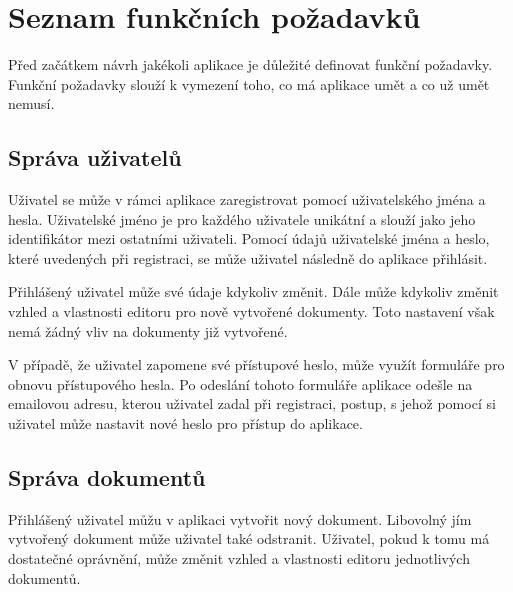 
\section{Seznam funkčních požadavků}\label{sec:funcniPozadavky}
Před začátkem návrh jakékoli aplikace je důležité definovat funkční požadavky.
Funkční požadavky slouží k vymezení toho, co má aplikace umět a co už umět nemusí.

\subsection{Správa uživatelů}\label{subsec:správaUživatelů}

Uživatel se může v rámci aplikace zaregistrovat pomocí uživatelského jména a hesla.
Uživatelské jméno je pro každého uživatele unikátní a slouží jako jeho identifikátor mezi ostatními uživateli.
Pomocí údajů uživatelské jména a heslo, které uvedených při registraci, se může uživatel následně do aplikace přihlásit.

Přihlášený uživatel může své údaje kdykoliv změnit.
Dále může kdykoliv změnit vzhled a vlastnosti editoru pro nově vytvořené dokumenty.
Toto nastavení však nemá žádný vliv na dokumenty již vytvořené.

V případě, že uživatel zapomene své přístupové heslo, může využít formuláře pro obnovu přístupového hesla.
Po odeslání tohoto formuláře aplikace odešle na emailovou adresu, kterou uživatel zadal při registraci, postup, s jehož pomocí si uživatel může nastavit nové heslo pro přístup do aplikace.


\subsection{Správa dokumentů}\label{subsec:správaDokumentů}

Přihlášený uživatel můžu v aplikaci vytvořit nový dokument.
Libovolný jím vytvořený dokument může uživatel také odstranit.
Uživatel, pokud k tomu má dostatečné oprávnění, může změnit vzhled a vlastnosti editoru jednotlivých dokumentů.

